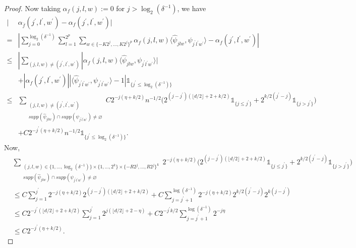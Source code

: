 \documentclass[10pt,a4paper]{amsart}
\begin{document}
\begin{proof}
Now
taking $\alpha_f(j,l,w):=0$ for $j> \log_2(\delta^{-1})$, we have 
\begin{align*}
    |&\alpha_{\overline{f}}(j^{'},l^{'},w^{'})-\alpha_f(j^{'},l^{'},w^{'})| \\
    = & | \sum \limits_{j=0}^{\log_2(\delta^{-1})} \sum \limits_{l=1}^{2^p} \sum \limits_{w\in \{-K2^{j},...,K2^j\}^p} \alpha_f(j,l,w) \langle\hat{\psi}_{jlw},\psi_{j^{'}l^{'}w^{'}}\rangle-\alpha_f(j^{'},l^{'},w^{'})|\\
     \leq & | \sum \limits_{(j,l,w)\neq (j^{'},l^{'},w^{'})} |\alpha_f(j,l,w)\langle \hat{\psi}_{jlw},\psi_{j^{'}l^{'}w^{'}}\rangle|\\
    & +|\alpha_f(j^{'},l^{'},w^{'})||\langle \hat{\psi}_{j^{'}l^{'}w^{'}} , \psi_{j^{'}l^{'}w^{'}}\rangle-1|\mathds{1}_{\{j^{'}\leq\log_2(\delta^{-1})\}}\\
     \leq & \sum \limits_{\substack{(j,l,w)\neq (j^{'},l^{'},w^{'})\\ supp(\hat{\psi}_{jlw})\cap supp(\psi_{j^{'}l^{'}w^{'}})\neq \varnothing}} C2^{-j(\eta+k/2)}n^{-1/2}\Big(2^{(j-j^{'})(\lfloor d/2 \rfloor +2+k/2)}\mathds{1}_{\{j\leq j^{'}\}}+2^{k/2(j^{'}-j)}\mathds{1}_{\{j> j^{'}\}}\Big)\\
     & + C2^{-j^{'}(\eta+k/2)}n^{-1/2}\mathds{1}_{\{j^{'}\leq\log_2(\delta^{-1})\}}.
\end{align*}
Now,
\begin{align*}
      &\sum \limits_{\substack{(j,l,w)\in \{1,...,\log_2(\delta^{-1})\}\times \{1,...,2^k\}\times \{-R2^{j},...,R2^j\}^k\\ supp(\hat{\psi}_{jlw})\cap supp(\psi_{j^{'}l^{'}w^{'}})\neq \varnothing}} 2^{-j(\eta+k/2)}\Big(2^{(j-j^{'})(\lfloor d/2 \rfloor +2+k/2)}\mathds{1}_{\{j\leq j^{'}\}}+2^{k/2(j^{'}-j)}\mathds{1}_{\{j> j^{'}\}}\Big)\\
    &\leq C\sum_{j=1}^{j^{'}} 2^{-j(\eta+k/2)}2^{(j-j^{'})(\lfloor d/2 \rfloor +2+k/2)}+C\sum_{j=j^{'}+1}^{\log(\delta^{-1})} 2^{-j(\eta+k/2)}2^{k/2(j^{'}-j)}2^{k(j-j^{'})}
    \\
    &\leq C 2^{-j^{'}(\lfloor d/2 \rfloor +2+k/2)}\sum_{j=1}^{j^{'}} 2^{j(\lfloor d/2 \rfloor +2-\eta)}+C 2^{-j^{'}k/2}\sum_{j=j^{'}+1}^{\log(\delta^{-1})} 2^{-j\eta}
    \\
    &\leq C 2^{-j^{'}(\eta+k/2)}.
\end{align*}
\end{proof}
\end{document}
